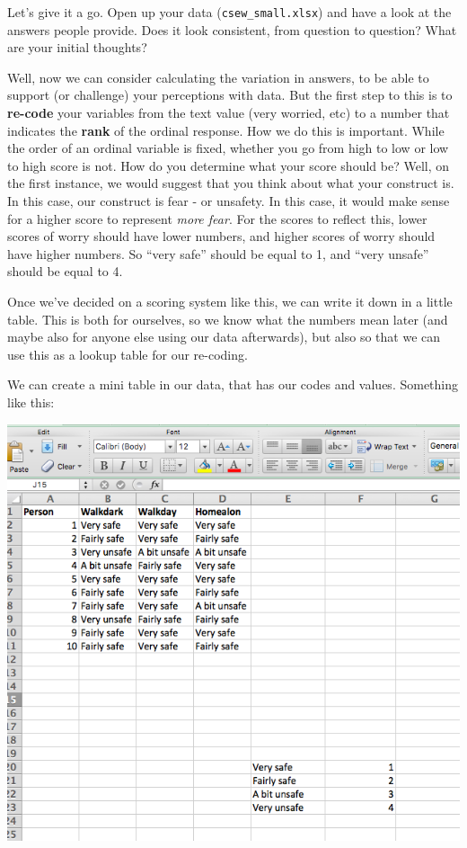 \documentclass[
]{book}
\begin{document}
Let's give it a go. Open up your data (\texttt{csew\_small.xlsx}) and have a look at the answers people provide. Does it look consistent, from question to question? What are your initial thoughts?

Well, now we can consider calculating the variation in answers, to be able to support (or challenge) your perceptions with data. But the first step to this is to \textbf{re-code} your variables from the text value (very worried, etc) to a number that indicates the \textbf{rank} of the ordinal response. How we do this is important. While the order of an ordinal variable is fixed, whether you go from high to low or low to high score is not. How do you determine what your score should be? Well, on the first instance, we would suggest that you think about what your construct is. In this case, our construct is fear - or unsafety. In this case, it would make sense for a higher score to represent \emph{more fear}. For the scores to reflect this, lower scores of worry should have lower numbers, and higher scores of worry should have higher numbers. So ``very safe'' should be equal to 1, and ``very unsafe'' should be equal to 4.

Once we've decided on a scoring system like this, we can write it down in a little table. This is both for ourselves, so we know what the numbers mean later (and maybe also for anyone else using our data afterwards), but also so that we can use this as a lookup table for our re-coding.

We can create a mini table in our data, that has our codes and values. Something like this:

\includegraphics{imgs/lookup_table.png}
\end{document}
